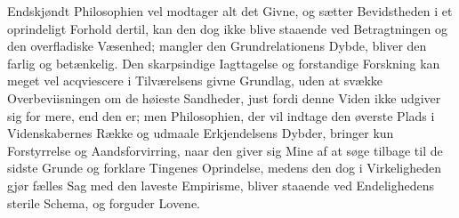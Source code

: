 \documentclass[12pt]{book}
\newcommand{\opage}[1]{\marginnote{\footnotesize\textit{[#1]}}}
\begin{document}
Endskjøndt Philosophien vel modtager alt det Givne, og sætter Bevidstheden i et oprindeligt
Forhold dertil, kan den dog ikke blive staaende ved Betragtningen og den overfladiske
Væsenhed; mangler den Grundrelationens Dybde, bliver den farlig og betænkelig. Den
skarpsindige Iagttagelse og forstandige Forskning kan meget vel acqviescere i Tilværelsens
givne Grundlag, uden at svække Overbeviisningen om de høieste Sandheder, just fordi denne
Viden ikke udgiver sig for mere, end den er; men Philosophien, der vil indtage den øverste
Plads i Videnskabernes Række og udmaale Erkjendelsens Dybder, bringer kun Forstyrrelse og
Aandsforvirring,
\opage{149} naar den giver sig Mine af at søge tilbage til de sidste Grunde og forklare Tingenes
Oprindelse, medens den dog i Virkeligheden gjør fælles Sag med den laveste Empirisme, bliver
staaende ved Endelighedens sterile Schema, og forguder Lovene.
\end{document}
